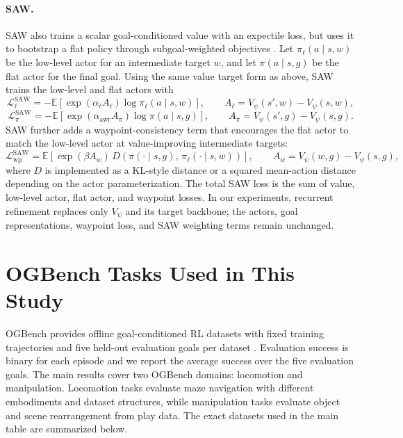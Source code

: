 \documentclass{article}
\begin{document}
\paragraph{SAW.}
SAW also trains a scalar goal-conditioned value with an expectile loss, but uses it to bootstrap a flat policy through subgoal-weighted objectives \citep{saw}.
Let $\pi_\ell(a\mid s,w)$ be the low-level actor for an intermediate target $w$, and let $\pi(a\mid s,g)$ be the flat actor for the final goal.
Using the same value target form as above, SAW trains the low-level and flat actors with
\begin{equation}
\mathcal{L}_{\ell}^{\mathrm{SAW}}
=
-\mathbb{E}\left[\exp(\alpha_\ell A_\ell)\log \pi_\ell(a\mid s,w)\right],
\qquad
A_\ell=V_\psi(s',w)-V_\psi(s,w),
\end{equation}
\begin{equation}
\mathcal{L}_{\pi}^{\mathrm{SAW}}
=
-\mathbb{E}\left[\exp(\alpha_{\mathrm{awr}} A_\pi)\log \pi(a\mid s,g)\right],
\qquad
A_\pi=V_\psi(s',g)-V_\psi(s,g).
\end{equation}
SAW further adds a waypoint-consistency term that encourages the flat actor to match the low-level actor at value-improving intermediate targets:
\begin{equation}
\mathcal{L}_{\mathrm{wp}}^{\mathrm{SAW}}
=
\mathbb{E}\left[
\exp(\beta A_w)\,
D\!\left(\pi(\cdot\mid s,g),\,\pi_\ell(\cdot\mid s,w)\right)
\right],
\qquad
A_w=V_\psi(w,g)-V_\psi(s,g),
\end{equation}
where $D$ is implemented as a KL-style distance or a squared mean-action distance depending on the actor parameterization.
The total SAW loss is the sum of value, low-level actor, flat actor, and waypoint losses.
In our experiments, recurrent refinement replaces only $V_\psi$ and its target backbone; the actors, goal representations, waypoint loss, and SAW weighting terms remain unchanged.

\section{OGBench Tasks Used in This Study}
\label{app:ogbench-tasks}

OGBench provides offline goal-conditioned RL datasets with fixed training trajectories and five held-out evaluation goals per dataset \citep{ogbench}.
Evaluation success is binary for each episode and we report the average success over the five evaluation goals.
The main results cover two OGBench domains: locomotion and manipulation.
Locomotion tasks evaluate maze navigation with different embodiments and dataset structures, while manipulation tasks evaluate object and scene rearrangement from play data.
The exact datasets used in the main table are summarized below.
\end{document}
